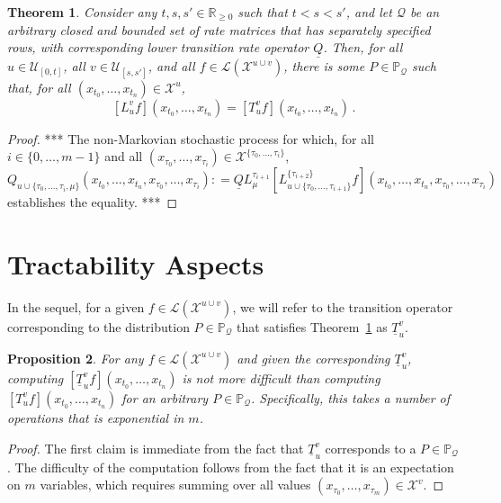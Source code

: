 \documentclass[10pt]{paper}
\newtheorem{theorem}{Theorem}
\newtheorem{proposition}[theorem]{Proposition}
\newcommand{\reals}{\mathbb{R}}
\newcommand{\realsnonneg}{\reals_{\geq 0}}
\newcommand{\states}{\mathcal{X}}
\newcommand{\lt}{\underline{T}}
\newcommand{\gambles}{\mathcal{L}}
\newcommand{\lrate}{\underline{Q}}
\newcommand{\coloneqq}{:\!=}
\begin{document}
\begin{theorem}\label{theorem:nonmarkov_multi_variable_lower_envelope}
Consider any $t,s,s'\in\realsnonneg$ such that $t<s<s'$, and let $\mathcal{Q}$ be an arbitrary closed and bounded set of rate matrices that has separately specified rows, with corresponding lower transition rate operator $\lrate$. Then, for all $u\in\mathcal{U}_{[0,t]}$, all $v\in\mathcal{U}_{[s,s']}$, and all $f\in\gambles(\states^{u\cup v})$, there is some $P\in\mathbb{P}_\mathcal{Q}$ such that, for all $(x_{t_0},\ldots,x_{t_n})\in\states^u$,
\begin{equation*}
\left[L_u^v f\right](x_{t_0},\ldots,x_{t_n}) = \left[T_u^v f\right](x_{t_0},\ldots,x_{t_n})\,.
\end{equation*}
\end{theorem}
\begin{proof}
*** The non-Markovian stochastic process for which, for all $i\in\{0,\ldots,{m-1}\}$ and all $(x_{\tau_0},\ldots,x_{\tau_i})\in\states^{\{\tau_0,\ldots,\tau_i\}}$,
\begin{equation*}
Q_{u\cup\{\tau_0,\ldots,\tau_i,\mu\}}(x_{t_0},\ldots,x_{t_n},x_{\tau_0},\ldots,x_{\tau_i}) \coloneqq \lrate L_\mu^{\tau_{i+1}} \left[L_{u\cup\{\tau_0,\ldots,\tau_{i+1}\}}^{\{\tau_{i+2}\}}f\right](x_{t_0},\ldots,x_{t_n},x_{\tau_0},\ldots,x_{\tau_i})
\end{equation*}
establishes the equality. ***
\end{proof}

\section{Tractability Aspects}\label{sec:tractability}

In the sequel, for a given $f\in\gambles(\states^{u\cup v})$, we will refer to the transition operator corresponding to the distribution $P\in\mathbb{P}_\mathcal{Q}$ that satisfies Theorem~\ref{theorem:nonmarkov_multi_variable_lower_envelope} 
as $\lt_u^v$.

\begin{proposition}
For any $f\in\gambles(\states^{u\cup v})$ and given the corresponding $\lt_u^v$, computing $\left[\lt_u^v f\right](x_{t_0},\ldots,x_{t_n})$ is not more difficult than computing $\left[T_u^v f\right](x_{t_0},\ldots,x_{t_n})$ for an arbitrary $P\in\mathbb{P}_{\mathcal{Q}}$. Specifically, this takes a number of operations that is exponential in $m$.
\end{proposition}
\begin{proof}
The first claim is immediate from the fact that $\lt_u^v$ corresponds to a $P\in\mathbb{P}_\mathcal{Q}$. The difficulty of the computation follows from the fact that it is an expectation on $m$ variables, which requires summing over all values $(x_{\tau_0},\ldots,x_{\tau_m})\in\states^v$.
\end{proof}
\end{document}
